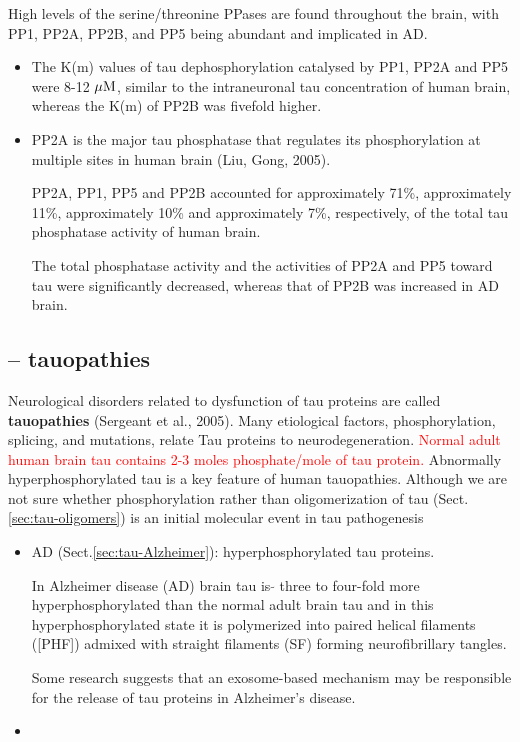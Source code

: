 High levels of the serine/threonine PPases are found throughout the
brain, with PP1, PP2A, PP2B, and PP5 being abundant and implicated in AD.

\begin{itemize}
  \item  The K(m) values of tau dephosphorylation catalysed by PP1, PP2A and PP5
  were 8-12 ${\mu\text{M}}$, similar to the intraneuronal tau concentration of human
  brain, whereas the K(m) of PP2B was fivefold higher. 
  
  \item PP2A is the major tau phosphatase that regulates its phosphorylation at
  multiple sites in human brain (Liu, Gong, 2005).
  
PP2A, PP1, PP5 and PP2B accounted for approximately 71\%, approximately 11\%,
approximately 10\% and approximately 7\%, respectively, of the total tau
phosphatase activity of human brain. 

The total phosphatase activity and the activities of PP2A and PP5 toward tau
were significantly decreased, whereas that of PP2B was increased in AD brain.

\end{itemize}


\subsection{-- tauopathies}
\label{sec:tauopathies}

Neurological disorders related to dysfunction of tau proteins are called {\bf 
tauopathies} (Sergeant et al., 2005). Many etiological factors,
phosphorylation, splicing, and mutations, relate Tau proteins to neurodegeneration.
\textcolor{red}{Normal adult human brain tau contains 2-3 moles phosphate/mole
of tau protein.}
Abnormally hyperphosphorylated tau is a key feature of human tauopathies.
Although we are not sure whether phosphorylation rather than oligomerization of
tau (Sect.\ref{sec:tau-oligomers}) is an initial molecular event in tau
pathogenesis

\begin{itemize}
  \item  AD (Sect.\ref{sec:tau-Alzheimer}): hyperphosphorylated tau proteins.
  

In Alzheimer disease (AD) brain tau is $\tilde{}$ three to four-fold more
hyperphosphorylated than the normal adult brain tau and in this
hyperphosphorylated state it is polymerized into paired helical filaments
([PHF]) admixed with straight filaments (SF) forming neurofibrillary tangles.

Some research suggests that an exosome-based mechanism may be responsible for
the release of tau proteins in Alzheimer's disease. 

\item 
\end{itemize}


